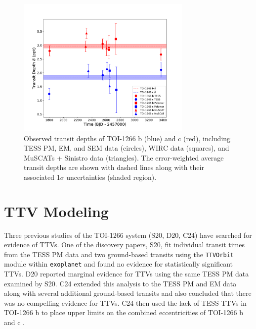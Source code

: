 \documentclass[twocolumn]{aastex631}
\begin{document}
\begin{figure}
  \includegraphics[width=8.5cm]{1266_RadiusCompar.pdf}
  \caption{Observed transit depths of TOI-1266 b (blue) and c (red), including TESS PM, EM, and SEM data (circles), WIRC data (squares), and MuSCATs + Sinistro data (triangles). The error-weighted average transit depths are shown with dashed lines along with their associated 1$\sigma$ uncertainties (shaded region).}
  \label{fig:radius analysis plot}
\end{figure}

\section{TTV Modeling}  \label{sec:ttv modeling}

Three previous studies of the TOI-1266 system (S20, D20, C24) have searched for evidence of TTVs. One of the discovery papers, S20, fit individual transit times from the TESS PM data and two ground-based transits using the \texttt{TTVOrbit} module within \texttt{exoplanet} and found no evidence for statistically significant TTVs. D20 reported marginal evidence for TTVs using the same TESS PM data examined by S20. C24 extended this analysis to the TESS PM and EM data along with several additional ground-based transits and also concluded that there was no compelling evidence for TTVs. C24 then used the lack of TESS TTVs in TOI-1266 b to place upper limits on the combined eccentricities of TOI-1266 b and c \citep[e.g.,][]{Hadden_2019}. 
\end{document}
